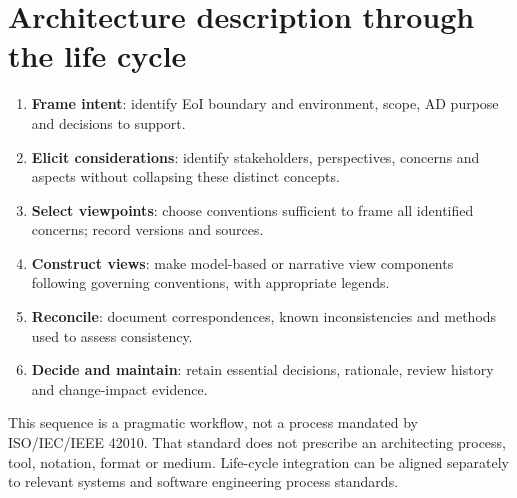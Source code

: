 \documentclass[11pt,letterpaper]{article}
\begin{document}
\section{Architecture description through the life cycle}
\begin{enumerate}
\item \textbf{Frame intent}: identify EoI boundary and environment, scope, AD purpose and decisions to support.
\item \textbf{Elicit considerations}: identify stakeholders, perspectives, concerns and aspects without collapsing these distinct concepts.
\item \textbf{Select viewpoints}: choose conventions sufficient to frame all identified concerns; record versions and sources.
\item \textbf{Construct views}: make model-based or narrative view components following governing conventions, with appropriate legends.
\item \textbf{Reconcile}: document correspondences, known inconsistencies and methods used to assess consistency.
\item \textbf{Decide and maintain}: retain essential decisions, rationale, review history and change-impact evidence.
\end{enumerate}
\begin{Guidance}This sequence is a pragmatic workflow, not a process mandated by ISO/IEC/IEEE 42010. That standard does not prescribe an architecting process, tool, notation, format or medium. Life-cycle integration can be aligned separately to relevant systems and software engineering process standards.\end{Guidance}
\end{document}
